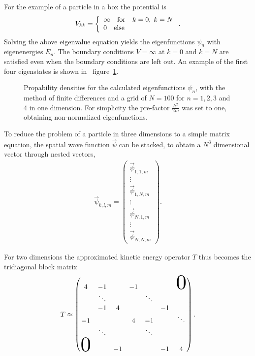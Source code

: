 \documentclass[twoside,        %
			   11pt,			%
               BCOR10mm,       %
               ngerman,english  %
               ]{scrartcl}
\begin{document}
\par For the example of a particle in a box the potential is
\begin{align} 
V_{kk} = \left\{ \begin{array}{ll}  \infty  \quad \text{for} \quad  k = 0, \; k= N \\  0 \quad \text{else} \end{array} \right. \text.
\end{align}
Solving the above eigenvalue equation yields the eigenfunctions $\psi_n$ with eigenenergies $E_n$. The boundary conditions $V = \infty$ at $k=0$ and $k=N$ are satisfied even when the boundary conditions are left out. An example of the first four eigenstates is shown in \mbox{ figure \ref{fig:eigenfunctions}.}
\begin{figure}[!htb]
	\Huge
	\centering
	\resizebox{!}{0.4\textwidth}{}
	\caption{Propability densities for the calculated eigenfunctions $\psi_n$, with the method of finite differences and a grid of $N=100$ for $n = 1,2,3$ and $4$ in one dimension. For simplicity the pre-factor $\frac{\hbar^2}{2m}$ was set to one, obtaining non-normalized eigenfunctions.}
	\label{fig:eigenfunctions}
\end{figure} 
To reduce the problem of a particle in three dimensions to a simple matrix equation, the spatial wave function $\vec{\psi}$ can be stacked, to obtain a $N^3$ dimensional vector through nested vectors,
\begin{align}
\vec{\psi}_{k,l,m} = \begin{pmatrix}\vec{\psi}_{1,1,m} \\ \vdots \\ \vec{\psi}_{1,N,m} \\ \vdots \\ \vec{\psi}_{N,1,m} \\ \vdots \\ \vec{\psi}_{N,N,m} \end{pmatrix}.
\end{align}

For two dimensions the approximated kinetic energy operator $T$ thus becomes the tridiagonal block matrix
\begin{align}
T \approx  \begin{pmatrix}
4	& -1	&  &  -1	 &     &     &  \scalebox{3}{$0$}  \\
    & \ddots	&     & 		&   \ddots   & 	& \\
    & -1 & 4 &  &  &-1 \\
-1 &      &          & 4     & -1       & & \ddots \\
    & \ddots &     &&    \ddots   &       &  \\
  \scalebox{3}{$0$}   &      & -1       &&         & -1     & 4 \\ 
\end{pmatrix} \text{.}
\end{align}
\end{document}

